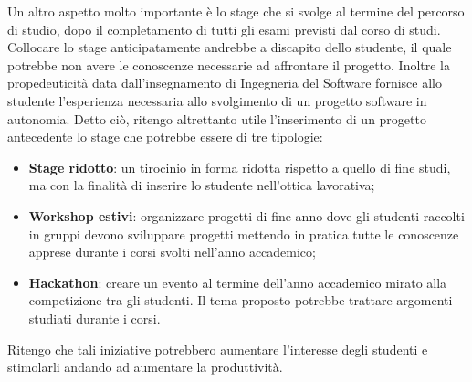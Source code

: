 Un altro aspetto molto importante è lo stage che si svolge al termine del percorso di studio, dopo il completamento di tutti gli esami previsti dal corso di studi. Collocare lo stage anticipatamente andrebbe a discapito dello studente, il quale potrebbe non avere le conoscenze necessarie ad affrontare il progetto. Inoltre la propedeuticità data dall'insegnamento di Ingegneria del Software fornisce allo studente l'esperienza necessaria allo svolgimento di un progetto software in autonomia. Detto ciò, ritengo altrettanto utile l'inserimento di un progetto antecedente lo stage che potrebbe essere di tre tipologie:
\begin{itemize}
\item \textbf{Stage ridotto}: un tirocinio in forma ridotta rispetto a quello di fine studi, ma con la finalità di inserire lo studente nell'ottica lavorativa;
\item \textbf{Workshop estivi}: organizzare progetti di fine anno dove gli studenti raccolti in gruppi devono sviluppare progetti mettendo in pratica tutte le conoscenze apprese durante i corsi svolti nell'anno accademico;
\item \textbf{Hackathon}: creare un evento al termine dell'anno accademico mirato alla competizione tra gli studenti. Il tema proposto potrebbe trattare argomenti studiati durante i corsi.
\end{itemize}

Ritengo che tali iniziative potrebbero aumentare l'interesse degli studenti e stimolarli andando ad aumentare la produttività.